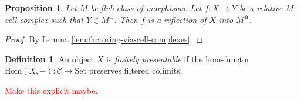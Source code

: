 \documentclass[a4paper]{article}
\newcommand{\todo}[1]{\textcolor{red}{#1}}
\newtheorem{proposition}[theorem]{Proposition}
\theoremstyle{remark}
\theoremstyle{definition}
\newtheorem{definition}[theorem]{Definition}
\begin{document}
\begin{proposition}
  Let $M$ be flub class of morphisms.
  Let $f : X \rightarrow Y$ be a relative $M$-cell complex such that $Y \in M^\perp$.
  Then $f$ is a reflection of $X$ into $M^\pitchfork$.
\end{proposition}
\begin{proof}
  By Lemma \ref{lem:factoring-via-cell-complexes}.
\end{proof}

\begin{definition}
  \label{def:finitely-presentable}
  An object $X$ is \emph{finitely presentable} if the hom-functor $\mathrm{Hom}(X, -) : \mathcal{C} \rightarrow \mathrm{Set}$ preserves filtered colimits.
\end{definition}
\todo{Make this explicit maybe.}
\end{document}
